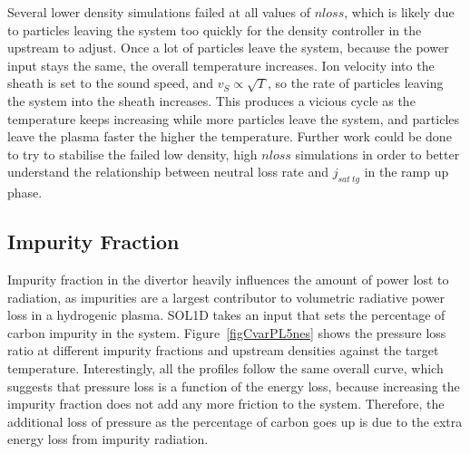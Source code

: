 \documentclass[12pt]{article}  %
\begin{document}
Several lower density simulations failed at all values of $nloss$, which is likely due to particles leaving the system too quickly for the density controller in the upstream to adjust. Once a lot of particles leave the system, because the power input stays the same, the overall temperature increases. Ion velocity into the sheath is set to the sound speed, and $v_S \propto \sqrt{T}$, so the rate of particles leaving the system into the sheath increases. This produces a vicious cycle as the temperature keeps increasing while more particles leave the system, and particles leave the plasma faster the higher the temperature. Further work could be done to try to stabilise the failed low density, high $nloss$ simulations in order to better understand the relationship between neutral loss rate and $j_{sat~tg}$ in the ramp up phase.



\subsection{Impurity Fraction}\label{ssecImpfrac}
Impurity fraction in the divertor heavily influences the amount of power lost to radiation, as impurities are a largest contributor to volumetric radiative power loss in a hydrogenic plasma. SOL1D takes an input that sets the percentage of carbon impurity in the system. Figure~\ref{figCvarPL5nes} shows the pressure loss ratio at different impurity fractions and upstream densities against the target temperature. Interestingly, all the profiles follow the same overall curve, which suggests that pressure loss is a function of the energy loss, because increasing the impurity fraction does not add any more friction to the system. Therefore, the additional loss of pressure as the percentage of carbon goes up is due to the extra energy loss from impurity radiation.
\end{document}
